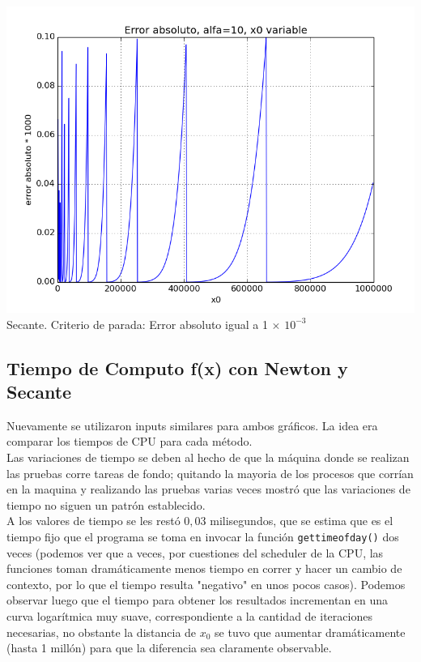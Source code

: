 \begin{center}
\includegraphics[scale=0.5]{graficos/x0s-f-secante-alfa_fijo-absoluto-0.001-alejando.png}\\
Secante. Criterio de parada: Error absoluto igual a 1 $\times$ $10^{-3}$
\end{center}


\subsection{Tiempo de Computo f(x) con Newton y Secante}
Nuevamente se utilizaron inputs similares para ambos gráficos. La idea era comparar los tiempos de CPU para cada método.\\

Las variaciones de tiempo se deben al hecho de que la máquina donde se realizan las pruebas corre tareas de fondo; quitando la mayoria de los procesos que corrían en la maquina y realizando las pruebas varias veces mostró que las variaciones de tiempo no siguen un patrón establecido.\\

A los valores de tiempo se les restó $0,03$ milisegundos, que se estima que es el tiempo fijo que el programa se toma en invocar la función \verb|gettimeofday()| dos veces (podemos ver que a veces, por cuestiones del scheduler de la CPU, las funciones toman dramáticamente menos tiempo en correr y hacer un cambio de contexto, por lo que el tiempo resulta "negativo" en unos pocos casos). Podemos observar luego que el tiempo para obtener los resultados incrementan en una curva logarítmica muy suave, correspondiente a la cantidad de iteraciones necesarias, no obstante la distancia de $x_0$ se tuvo que aumentar dramáticamente (hasta 1 millón) para que la diferencia sea claramente observable.\\

